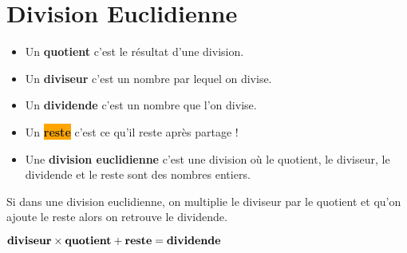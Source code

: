 
\section{Division Euclidienne}
\begin{definition}[Vocabulaire]
\begin{itemize}
\item Un \colorbox{red!30}{\textbf{quotient}} c'est le résultat d'une division.
\item Un \colorbox{green!30}{\textbf{diviseur}} c'est un nombre par lequel on divise.
\item Un \colorbox{blue!30}{\textbf{dividende}} c'est un nombre que l'on divise.
\item Un \colorbox{orange}{\textbf{reste}} c'est ce qu'il reste après partage !
\item Une \textbf{division euclidienne} c'est une division où le quotient, le diviseur, le dividende et le reste sont des nombres entiers.
\end{itemize}
\end{definition}

\begin{propriete}[\admise]
	Si dans une division euclidienne, on multiplie le diviseur par le quotient et qu'on ajoute le reste	alors on retrouve le dividende.
	\begin{center}
		$\text{\textbf{diviseur}}\times\text{\textbf{quotient}}+\text{\textbf{reste}}=\text{\textbf{dividende}}$
	\end{center}
\end{propriete}

